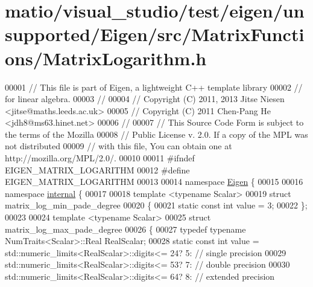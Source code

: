 \hypertarget{matio_2visual__studio_2test_2eigen_2unsupported_2_eigen_2src_2_matrix_functions_2_matrix_logarithm_8h_source}{}\section{matio/visual\+\_\+studio/test/eigen/unsupported/\+Eigen/src/\+Matrix\+Functions/\+Matrix\+Logarithm.h}
\label{matio_2visual__studio_2test_2eigen_2unsupported_2_eigen_2src_2_matrix_functions_2_matrix_logarithm_8h_source}

\begin{DoxyCode}
00001 \textcolor{comment}{// This file is part of Eigen, a lightweight C++ template library}
00002 \textcolor{comment}{// for linear algebra.}
00003 \textcolor{comment}{//}
00004 \textcolor{comment}{// Copyright (C) 2011, 2013 Jitse Niesen <jitse@maths.leeds.ac.uk>}
00005 \textcolor{comment}{// Copyright (C) 2011 Chen-Pang He <jdh8@ms63.hinet.net>}
00006 \textcolor{comment}{//}
00007 \textcolor{comment}{// This Source Code Form is subject to the terms of the Mozilla}
00008 \textcolor{comment}{// Public License v. 2.0. If a copy of the MPL was not distributed}
00009 \textcolor{comment}{// with this file, You can obtain one at http://mozilla.org/MPL/2.0/.}
00010 
00011 \textcolor{preprocessor}{#ifndef EIGEN\_MATRIX\_LOGARITHM}
00012 \textcolor{preprocessor}{#define EIGEN\_MATRIX\_LOGARITHM}
00013 
00014 \textcolor{keyword}{namespace }\hyperlink{namespace_eigen}{Eigen} \{ 
00015 
00016 \textcolor{keyword}{namespace }\hyperlink{namespaceinternal}{internal} \{ 
00017 
00018 \textcolor{keyword}{template} <\textcolor{keyword}{typename} Scalar>
00019 \textcolor{keyword}{struct }matrix\_log\_min\_pade\_degree 
00020 \{
00021   \textcolor{keyword}{static} \textcolor{keyword}{const} \textcolor{keywordtype}{int} value = 3;
00022 \};
00023 
00024 \textcolor{keyword}{template} <\textcolor{keyword}{typename} Scalar>
00025 \textcolor{keyword}{struct }matrix\_log\_max\_pade\_degree 
00026 \{
00027   \textcolor{keyword}{typedef} \textcolor{keyword}{typename} NumTraits<Scalar>::Real RealScalar;
00028   \textcolor{keyword}{static} \textcolor{keyword}{const} \textcolor{keywordtype}{int} value = std::numeric\_limits<RealScalar>::digits<= 24?  5:  \textcolor{comment}{// single precision}
00029                            std::numeric\_limits<RealScalar>::digits<= 53?  7:  \textcolor{comment}{// double precision}
00030                            std::numeric\_limits<RealScalar>::digits<= 64?  8:  \textcolor{comment}{// extended precision}

\end{DoxyCode}
